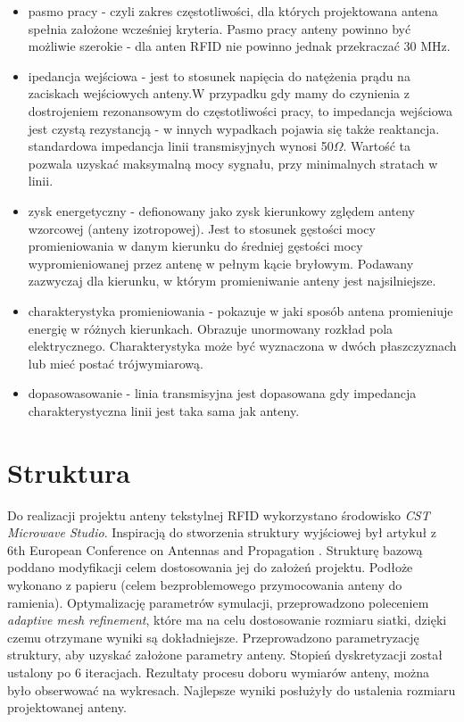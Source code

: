 \begin{itemize}\setlength{\itemsep}{0pt}

	\item pasmo pracy - czyli zakres częstotliwości, dla których projektowana antena spełnia założone wcześniej kryteria. Pasmo pracy anteny powinno być możliwie szerokie - dla anten RFID nie powinno jednak przekraczać 30 MHz. 

	\item ipedancja wejściowa - jest to stosunek napięcia do natężenia prądu na zaciskach wejściowych anteny.W przypadku gdy mamy do czynienia z dostrojeniem rezonansowym do częstotliwości pracy, to impedancja wejściowa jest czystą rezystancją - w innych wypadkach pojawia się także reaktancja.
	standardowa impedancja linii transmisyjnych wynosi 50\(\Omega\). Wartość ta pozwala uzyskać maksymalną mocy sygnału, przy minimalnych stratach w linii.

	\item zysk energetyczny - defionowany jako zysk kierunkowy zględem anteny wzorcowej (anteny izotropowej).
	Jest to stosunek gęstości mocy promieniowania w danym kierunku do średniej gęstości mocy wypromieniowanej przez antenę w pełnym kącie bryłowym. Podawany zazwyczaj dla kierunku, w którym promieniwanie anteny jest najsilniejsze.  

	\item charakterystyka promieniowania - pokazuje w jaki sposób antena promieniuje energię w różnych kierunkach. Obrazuje unormowany rozkład pola elektrycznego. Charakterystyka może być wyznaczona w dwóch płaszczyznach lub mieć postać trójwymiarową.

	\item dopasowasowanie - linia transmisyjna jest dopasowana gdy impedancja charakterystyczna linii jest taka sama jak anteny. 

\end{itemize}

\section{Struktura}

Do realizacji projektu anteny tekstylnej RFID wykorzystano środowisko \emph{CST Microwave Studio}. Inspiracją do stworzenia struktury wyjściowej był artykuł z 6th European Conference on Antennas and Propagation \cite{Artykul}. Strukturę bazową poddano modyfikacji celem dostosowania jej do założeń projektu. Podłoże wykonano z papieru (celem bezproblemowego przymocowania anteny do ramienia). Optymalizację parametrów symulacji, przeprowadzono poleceniem \emph{adaptive mesh refinement}, które ma na celu dostosowanie rozmiaru siatki, dzięki czemu otrzymane wyniki są dokładniejsze. Przeprowadzono parametryzację struktury, aby uzyskać założone parametry anteny. Stopień dyskretyzacji został ustalony po 6 iteracjach. Rezultaty procesu doboru wymiarów anteny, można było obserwować na wykresach. Najlepsze wyniki posłużyły do ustalenia rozmiaru projektowanej anteny. 






